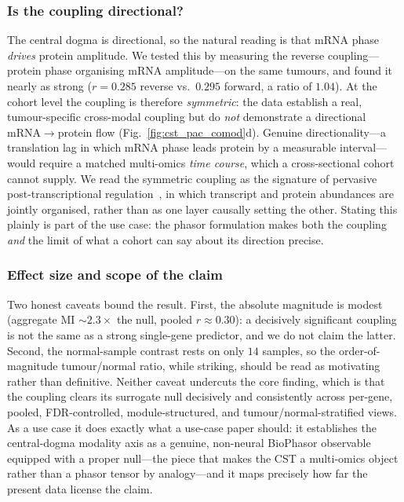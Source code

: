 \documentclass[preprint,12pt,amsmath,amssymb,superscriptaddress,floatfix]{revtex4-2}
\begin{document}
\subsubsection{Is the coupling directional?}

The central dogma is directional, so the natural reading is that mRNA phase
\emph{drives} protein amplitude. We tested this by measuring the reverse
coupling---protein phase organising mRNA amplitude---on the same tumours, and
found it nearly as strong ($r=0.285$ reverse vs.\ $0.295$ forward, a ratio of
$1.04$). At the cohort level the coupling is therefore \emph{symmetric}: the data
establish a real, tumour-specific cross-modal coupling but do \emph{not}
demonstrate a directional mRNA$\to$protein flow (Fig.~\ref{fig:cst_pac_comod}d).
Genuine directionality---a translation lag in which mRNA phase leads protein by a
measurable interval---would require a matched multi-omics \emph{time course},
which a cross-sectional cohort cannot supply. We read the symmetric coupling as
the signature of pervasive post-transcriptional regulation~\citep{srivastava2022},
in which transcript and protein abundances are jointly organised, rather than as
one layer causally setting the other. Stating this plainly is part of the use
case: the phasor formulation makes both the coupling \emph{and} the limit of what
a cohort can say about its direction precise.

\subsubsection{Effect size and scope of the claim}

Two honest caveats bound the result. First, the absolute magnitude is modest
(aggregate MI $\sim\!2.3\times$ the null, pooled $r\approx0.30$): a decisively
significant coupling is not the same as a strong single-gene predictor, and we do
not claim the latter. Second, the normal-sample contrast rests on only $14$
samples, so the order-of-magnitude tumour/normal ratio, while striking, should be
read as motivating rather than definitive. Neither caveat undercuts the core
finding, which is that the coupling clears its surrogate null decisively and
consistently across per-gene, pooled, FDR-controlled, module-structured, and
tumour/normal-stratified views. As a use case it does exactly what a use-case
paper should: it establishes the central-dogma modality axis as a genuine,
non-neural BioPhasor observable equipped with a proper null---the piece that makes
the CST a multi-omics object rather than a phasor tensor by analogy---and it maps
precisely how far the present data license the claim.
\end{document}

